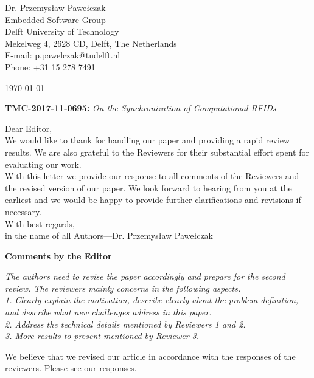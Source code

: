\documentclass[10pt]{article}
\newcommand{\referee}[1]{
	{\item \color{OliveGreen} \emph{{#1}}}
	\label{R\therefereeCounter:\arabic{enumi}}
}
\newcommand{\response}[1]{{\color{blue} #1}}
\newenvironment{editor}{%
\textbf{\large Comments by the Editor}
\begin{enumerate}%
\renewcommand{\labelenumi}{\textbf{[E:\,\arabic{enumi}]}} %
}{\pagebreak\end{enumerate}}
\newcounter{refereeCounter}
\begin{document}
\pagestyle{myheadings}
\thispagestyle{empty}


\headsep 0.5cm

\bigskip\bigskip


\bigskip\bigskip

\begin{flushright}
Dr. Przemys{\l}aw Pawe{\l}czak \\
Embedded Software Group \\ 
Delft University of Technology \\ 
Mekelweg 4, 2628 CD, Delft, The Netherlands \\
E-mail: p.pawelczak@tudelft.nl\\
Phone: +31 15 278 7491\\
\end{flushright}

\vspace*{2cm}

\today
\medskip


\textbf{TMC-2017-11-0695:} {\sl On the Synchronization of Computational RFIDs}

\bigskip

Dear Editor,\\

We would like to thank for handling our paper and providing a rapid review results. We are also grateful to the Reviewers for their substantial effort spent for evaluating our work. \\

With this letter we provide our response to all comments of the Reviewers and the revised version of our paper. We look forward to hearing from you at the earliest and we would be happy to provide further clarifications and revisions if necessary. \\

With best regards, \\

in the name of all Authors---Dr. Przemys{\l}aw Pawe{\l}czak

\pagebreak

\begin{editor}
\referee{The authors need to revise the paper accordingly and prepare for the second review. The reviewers mainly concerns in the following aspects. \\
1. Clearly explain the motivation, describe clearly about the problem definition, and describe what new challenges address
in this paper. \\
2. Address the technical details mentioned by Reviewers 1 and 2. \\
3. More results to present mentioned by Reviewer 3.
}

\response{
	We believe that we revised our article in accordance with the responses of the reviewers. Please see our responses. 
}

\end{editor}
\end{document}
